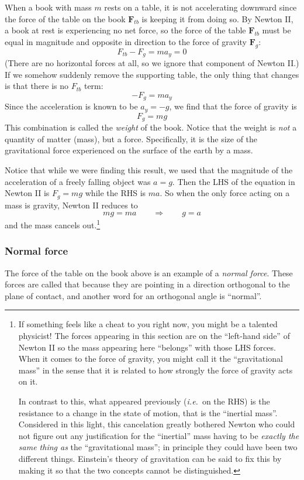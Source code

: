 When a book with mass $m$ rests on a table, it is not accelerating downward since the force of the table on the book $𝐅_{tb}$ is keeping it from doing so. By Newton II, a book at rest is experiencing no net force, so the force of the table $𝐅_{tb}$ must be equal in magnitude and opposite in direction to the force of gravity $𝐅_{g}$:
$$
F_{tb} - F_g = m a_y = 0
$$ 
(There are no horizontal forces at all, so we ignore that component of Newton II.)
If we somehow suddenly remove the supporting table, the only thing that changes is that there is no $F_{tb}$ term:
$$
- F_g = m a_y 
$$ 
Since the acceleration is known to be $a_y = - g$, we find that the force of gravity is
$$
F_g = m g
$$ 
This combination is called the {\em weight} of the book. Notice that the weight is {\em not} a quantity of matter (mass), but a force. Specifically, it is the size of the gravitational force experienced on the surface of the earth by a mass. 

Notice that while we were finding this result, we used that the magnitude of the acceleration of a freely falling object was $a = g$. Then the LHS of the equation in Newton II is $F_g=mg$ while the RHS is $ma$. So when the only force acting on a mass is gravity, Newton II reduces to 
$$
mg = ma\quad \quad ⇒ \quad \quad g = a
$$
and the mass cancels out.\footnote{If something feels like a cheat to you right now, you might be a talented physicist! The forces appearing in this section are on the “left-hand side” of Newton II so the mass appearing here “belongs” with those LHS forces. When it comes to the force of gravity, you might call it the “gravitational mass” in the sense that it is related to how strongly the force of gravity acts on it. 

In contrast to this, what appeared previously ({\it i.e.}\ on the RHS) is the resistance to a change in the state of motion, that is the “inertial mass”. 
Considered in this light, this cancelation greatly bothered Newton who could not figure out any justification for the “inertial” mass having to be {\em exactly the same thing as} the “gravitational mass”; in principle they could have been two different things. Einstein's theory of gravitation can be said to fix this by making it so that the two concepts cannot be distinguished. 
}

\subsubsection{Normal force}
The force of the table on the book above is an example of a {\em normal force}. These forces are called that because they are pointing in a direction orthogonal to the plane of contact, and another word for an orthogonal angle is “normal”. 


